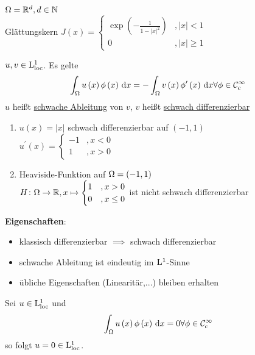 \begin{expl}
	$\Omega=\mathbb{R}^{d},d\in\mathbb{N}$\\
	Glättungskern $J\left(x\right)=\begin{cases}
		\operatorname{exp}\left(-\frac{1}{1-|x|^{2}}\right) &, |x| < 1\\
		0 &, |x| \geq 1
	\end{cases}$
\end{expl}

\begin{definition}
	$u,v\in\mathrm{L}^{1}_{\text{loc}}$. Es gelte
	\begin{equation*}
		\int_{\Omega}u\left(x\right)\phi\left(x\right)\,\mathrm{d}x = -\int_{\Omega}v\left(x\right)\phi^{\prime}\left(x\right)\,\mathrm{d}x \forall\phi\in\mathcal{C}^{\infty}_{\text{c}}
	\end{equation*}
	$u$ heißt \underline{schwache Ableitung} von $v$, $v$ heißt \underline{schwach differenzierbar}
\end{definition}

\begin{expl}
	\begin{enumerate}
		\item{}
			$u\left(x\right) = |x|$ schwach differenzierbar auf $\left(-1,1\right)$\\
			$u^{\prime}\left(x\right) = \begin{cases}
				-1 &, x<0\\
				1 &, x>0
			\end{cases}$
		\item Heaviside-Funktion auf $\Omega = \left(-1,1\right)$\\
			$H\colon\Omega\to\mathbb{R}, x\mapsto\begin{cases}
				1 &, x>0\\
				0 &, x\leq 0
			\end{cases}$ ist nicht schwach differenzierbar
	\end{enumerate}
\end{expl}

\textbf{Eigenschaften}:
\begin{itemize}
	\item klassisch differenzierbar $\implies$ schwach differenzierbar
	\item schwache Ableitung ist eindeutig im $\mathrm{L}^{1}$-Sinne
	\item übliche Eigenschaften (Linearitär,...) bleiben erhalten
\end{itemize}

\begin{lemma}
	Sei $u\in\mathrm{L}^{1}_{\text{loc}}$ und
	\begin{equation*}
		\int_{\Omega}u\left(x\right)\phi\left(x\right)\,\mathrm{d}x = 0 \forall\phi\in\mathcal{C}^{\infty}_{\text{c}}
	\end{equation*}
	so folgt $u=0\in\mathrm{L}^{1}_{\text{loc}}$.
\end{lemma}

